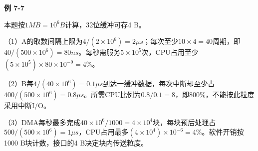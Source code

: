 {\color{ink}\bfseries 例 7-7}\par\vspace{1bp}本题按\(1 MB=\allowbreak{}10^{6} B\)计算，32位缓冲可存4 B。\par （1）A的取数间隔上限为\(4/\allowbreak{}(2\times 10^{6})=\allowbreak{}2 \mu s\)；每次至少\(10\times 4=\allowbreak{}40\)周期，即\(40/\allowbreak{}(500\times 10^{6})=\allowbreak{}80 ns\)。每秒需服务\(5\times 10^{5}\)次，CPU占用至少\((5\times 10^{5})\times 80\times 10^{-9}=\allowbreak{}4\%\)。\par （2）B每\(4/\allowbreak{}(40\times 10^{6})=\allowbreak{}0.1 \mu s\)到达一缓冲数据，每次中断却至少占\(400/\allowbreak{}(500\times 10^{6})=\allowbreak{}0.8 \mu s\)。所需CPU比例为\(0.8/\allowbreak{}0.1=\allowbreak{}8\)，即800\%，不能按此粒度采用中断I/\allowbreak{}O。\par （3）DMA每秒最多完成\(40\times 10^{6}/\allowbreak{}1000=\allowbreak{}4\times 10^{4}\)块，每块预后处理占\(500/\allowbreak{}(500\times 10^{6})=\allowbreak{}1 \mu s\)，CPU占用最多\((4\times 10^{4})\times 10^{-6}=\allowbreak{}4\%\)。软件开销按1000 B块计数，接口的4 B决定块内传送粒度。
